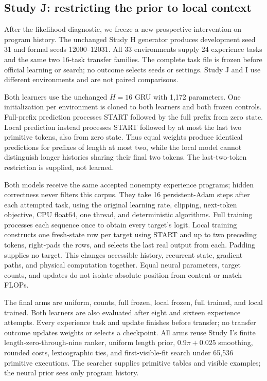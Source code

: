 \documentclass[11pt]{article}
\begin{document}
\subsection{Study J: restricting the prior to local context}
After the likelihood diagnostic, we freeze a new prospective intervention on
program history. The unchanged Study H generator produces development seed
31 and formal seeds 12000--12031. All 33 environments supply 24 experience
tasks and the same two 16-task transfer families. The complete task file is
frozen before official learning or search; no outcome selects seeds or settings.
Study J and I use different environments and are not paired comparisons.

Both learners use the unchanged $H=16$ GRU with 1,172 parameters. One
initialization per environment is cloned to both learners and both frozen
controls. Full-prefix prediction processes START followed by the full prefix
from zero state. Local prediction instead processes START followed by at most
the last two primitive tokens, also from zero state. Thus equal weights
produce identical predictions for prefixes of length at most two, while
the local model cannot distinguish longer histories sharing their final
two tokens. The last-two-token restriction is supplied, not learned.

Both models receive the same accepted nonempty experience programs; hidden
correctness never filters this corpus. They take 16 persistent-Adam steps
after each attempted task, using the original learning rate, clipping, next-token objective,
CPU float64, one thread, and deterministic algorithms. Full training processes
each sequence once to obtain every target's logit. Local training constructs
one fresh-state row per target using START and up to two preceding tokens,
right-pads the rows, and selects the last real output from each. Padding
supplies no target. This changes accessible history, recurrent state,
gradient paths, and physical computation together. Equal neural parameters,
target counts, and updates do not isolate absolute position from content or
match FLOPs.

The final arms are uniform, counts, full frozen, local frozen, full trained,
and local trained. Both learners are also evaluated after eight and sixteen
experience attempts. Every experience task and update finishes before transfer;
no transfer outcome updates weights or selects a checkpoint. All arms reuse
Study I's finite length-zero-through-nine ranker, uniform length prior,
$0.9\pi+0.025$ smoothing, rounded costs, lexicographic ties, and first-visible-fit
search under 65,536 primitive executions. The searcher supplies primitive
tables and visible examples; the neural prior sees only program history.
\end{document}
